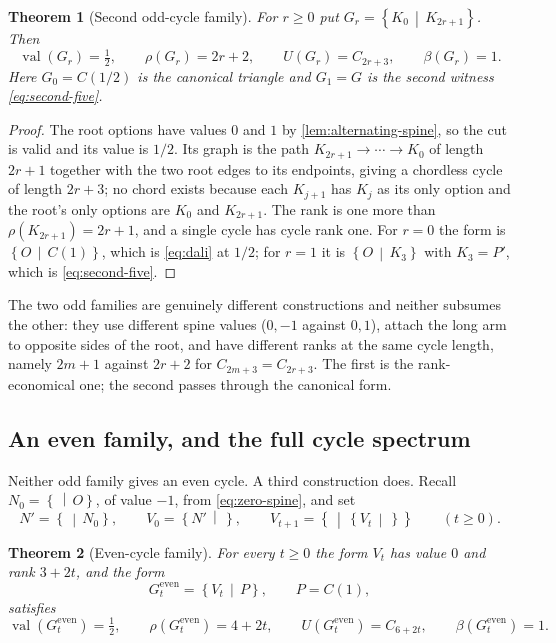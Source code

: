 \documentclass[11pt,a4paper]{article}
\numberwithin{equation}{section}
\newtheorem{theorem}{Theorem}[section]
\theoremstyle{definition}
\theoremstyle{remark}
\newcommand{\val}{\operatorname{val}}
\newcommand{\rk}{\rho}
\newcommand{\cut}[2]{\left\{#1\,\middle|\,#2\right\}}
\newcommand{\can}{C}
\begin{document}
\begin{theorem}[Second odd-cycle family]
\label{thm:odd-cycle-two}
For $r\geq0$ put $G_r=\cut{K_0}{K_{2r+1}}$. Then
\begin{equation}
\label{eq:odd-two-stats}
 \val(G_r)=\tfrac12,\qquad
 \rk(G_r)=2r+2,\qquad
 U(G_r)=C_{2r+3},\qquad
 \beta(G_r)=1 .
\end{equation}
Here $G_0=\can(1/2)$ is the canonical triangle and $G_1=G$ is the second witness
\eqref{eq:second-five}.
\end{theorem}

\begin{proof}
The root options have values $0$ and $1$ by \cref{lem:alternating-spine}, so the
cut is valid and its value is $1/2$. Its graph is the path
$K_{2r+1}\to\cdots\to K_0$ of length $2r+1$ together with the two root edges to
its endpoints, giving a chordless cycle of length $2r+3$; no chord exists because
each $K_{j+1}$ has $K_j$ as its only option and the root's only options are
$K_0$ and $K_{2r+1}$. The rank is one more than $\rk(K_{2r+1})=2r+1$, and a
single cycle has cycle rank one. For $r=0$ the form is $\cut{O}{\can(1)}$, which
is \eqref{eq:dali} at $1/2$; for $r=1$ it is $\cut{O}{K_3}$ with
$K_3=P'$, which is \eqref{eq:second-five}.
\end{proof}

The two odd families are genuinely different constructions and neither subsumes
the other: they use different spine values ($0,-1$ against $0,1$), attach the
long arm to opposite sides of the root, and have different ranks at the same
cycle length, namely $2m+1$ against $2r+2$ for $C_{2m+3}=C_{2r+3}$. The first is
the rank-economical one; the second passes through the canonical form.

\subsection{An even family, and the full cycle spectrum}

Neither odd family gives an even cycle. A third construction does. Recall
$N_0=\cut{}{O}$, of value $-1$, from \eqref{eq:zero-spine}, and set
\begin{equation}
\label{eq:even-spine}
 N'=\cut{}{N_0},\qquad
 V_0=\cut{N'}{},\qquad
 V_{t+1}=\cut{}{\cut{V_t}{}}\qquad(t\geq0).
\end{equation}

\begin{theorem}[Even-cycle family]
\label{thm:even-cycle}
For every $t\geq0$ the form $V_t$ has value $0$ and rank $3+2t$, and the form
\begin{equation}
 G^{\mathrm{even}}_t=\cut{V_t}{P},\qquad P=\can(1),
\end{equation}
satisfies
\begin{equation}
\label{eq:even-stats}
 \val(G^{\mathrm{even}}_t)=\tfrac12,\qquad
 \rk(G^{\mathrm{even}}_t)=4+2t,\qquad
 U(G^{\mathrm{even}}_t)=C_{6+2t},\qquad
 \beta(G^{\mathrm{even}}_t)=1 .
\end{equation}
\end{theorem}
\end{document}
